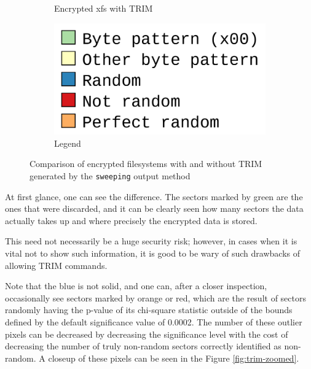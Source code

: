\documentclass[
  digital, %
  color,   %
  oneside, %
  lof,     %
  nolot,     %
]{fithesis4}
\begin{document}
\begin{figure}
\begin{subfigure}[b]{0.45\textwidth}
    \caption{Encrypted xfs with TRIM}
    \label{fig:trim-xfs-trim}
  \end{subfigure}
  \begin{subfigure}[b]{0.45\textwidth}
    \centering
    \includegraphics[width=\textwidth]{legend.png}
    \caption{Legend}
    \label{fig:trim-legend1}
  \end{subfigure}
  \caption{Comparison of encrypted filesystems with and without TRIM generated by the \texttt{sweeping} output method}
  \label{fig:trim-comparison}
\end{figure}

At first glance, one can see the difference.
The sectors marked by green are the ones that were discarded, and it can be clearly seen how many sectors the data actually takes up and where precisely the encrypted data is stored.

This need not necessarily be a huge security risk; however, in cases when it is vital not to show such information, it is good to be wary of such drawbacks of allowing TRIM commands.

Note that the blue is not solid, and one can, after a closer inspection, occasionally see sectors marked by orange or red, which are the result of sectors randomly having the p-value of its chi-square statistic outside of the bounds defined by the default significance value of 0.0002.
The number of these outlier pixels can be decreased by decreasing the significance level with the cost of decreasing the number of truly non-random sectors correctly identified as non-random.
A closeup of these pixels can be seen in the Figure \ref{fig:trim-zoomed}.
\end{document}

